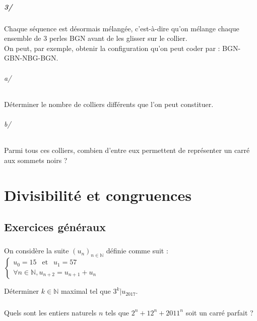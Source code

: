 		\paragraph{3/} Chaque séquence est désormais mélangée, c'est-à-dire qu'on mélange chaque ensemble de $3$ perles BGN avant de les glisser sur le collier. \\

		On peut, par exemple, obtenir la configuration qu'on peut coder par : BGN-GBN-NBG-BGN.

			\subparagraph{a/} Déterminer le nombre de colliers différents que l'on peut constituer.

			\subparagraph{b/} Parmi tous ces colliers, combien d'entre eux permettent de représenter un carré aux sommets noirs ?
		


\chapter{Divisibilité et congruences}

	\section{Exercices généraux}

		\subsection{}

			On considère la suite $(u_n)_{n\in\mathbb{N}}$ définie comme suit : $
			\left\{ \begin{array}{l}
				u_0 = 15 ~~\text{ et } ~~ u_1 = 57 \\
				\forall n \in \mathbb{N}, u_{n+2} = u_{n+1} + u_n
			\end{array} \right. $

			Déterminer $k\in\mathbb{N}$ maximal tel que $3^k \vert u_{2017}$.
		
		\subsection{}

			Quels sont les entiers naturels $n$ tels que $2^n + 12^n + 2011^n$ soit un carré parfait ?

		\subsection{}

